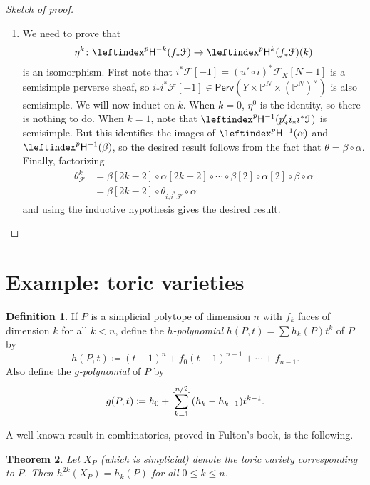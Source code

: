 \documentclass{amsart}
\DeclarePairedDelimiter{\floor}{\lfloor}{\rfloor}
\newtheorem{thm}{Theorem}[section]
\theoremstyle{definition}
\newtheorem{defn}[thm]{Definition}
\theoremstyle{remark}
\theoremstyle{plain}
\theoremstyle{definition}
\theoremstyle{remark}
\renewcommand{\P}{\mathbb{P}}
\newcommand{\sH}{\mathsf{H}}
\newcommand{\pH}{\leftindex^p{\mathsf{H}}}
\newcommand{\mc}[1]{\mathcal{#1}}
\newcommand{\ms}[1]{\mathsf{#1}}
\newcommand{\1}{\mathbf{1}}
\newcommand{\2}{\mathbf{2}}
\newcommand{\3}{\mathbf{3}}
\begin{document}
\begin{proof}[Sketch of proof]
\begin{enumerate}
            is surjective and identifies $\pH^1(p'_* \mc{F})(1)$ with the largest quotient of $\pH^{-1}(p'_* i_* i^* \mc{F})$ which lies in the essential image of $u^*[N]$.
        \item We need to prove that
            \[ \eta^k \colon \leftindex^p \sH^{-k}(f_* \mc{F}) \to \leftindex^p \sH^k (f_* \mc{F})(k) \]
            is an isomorphism. First note that $i^* \mc{F}[-1] = (u' \circ i)^* \mc{F}_X [N-1]$ is a semisimple perverse sheaf, so $i_* i^* \mc{F}[-1] \in \ms{Perv}(Y \times \P^N \times (\P^N)^{\vee})$ is also semisimple. We will now induct on $k$. When $k=0$, $\eta^0$ is the identity, so there is nothing to do.
            When $k = 1$, note that $\pH^{-1}(p'_* i_* i^* \mc{F})$ is semisimple. But this identifies the images of $\pH^{-1}(\alpha)$ and $\pH^{-1}(\beta)$, so the desired result follows from the fact that $\theta = \beta \circ \alpha$. Finally, factorizing
            \begin{align*}
                \theta_{\mc{F}}^k &= \beta[2k-2] \circ \alpha[2k-2] \circ \cdots \circ \beta[2] \circ \alpha[2] \circ \beta \circ \alpha \\
                &= \beta[2k-2] \circ \theta_{i_* i^* \mc{F}} \circ \alpha
            \end{align*}
            and using the inductive hypothesis gives the desired result. \qedhere
    \end{enumerate}
\end{proof}

\section{Example: toric varieties}%
\label{sec:Example: toric varieties}


\begin{defn}
    If $P$ is a simplicial polytope of dimension $n$ with $f_k$ faces of dimension $k$ for all $k < n$, define the \textit{$h$-polynomial} $h(P,t) = \sum h_k(P) t^k$ of $P$ by
    \[ h(P, t) \coloneqq (t-1)^n + f_0 (t-1)^{n-1} + \cdots + f_{n-1}. \]
    Also define the \textit{$g$-polynomial} of $P$ by
    \[ g(P,t) \coloneqq h_0 + \sum_{k=1}^{\floor{n/2}} (h_k - h_{k-1})t^{k-1}. \]
\end{defn}

A well-known result in combinatorics, proved in Fulton's book, is the following.
\begin{thm}
    Let $X_P$ (which is simplicial) denote the toric variety corresponding to $P$. Then $h^{2k}(X_P) = h_k(P)$ for all $0 \leq k \leq n$.
\end{thm}
\end{document}
